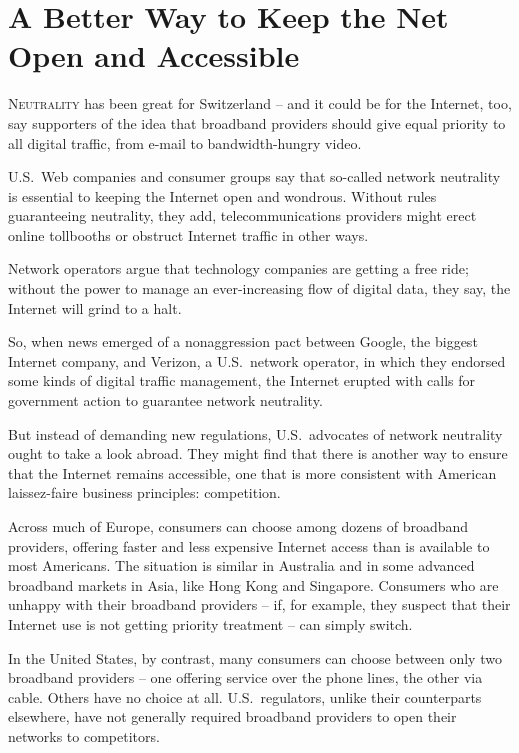 ﻿\documentclass[12pt]{article}
\begin{document}
\section{A Better Way to Keep the Net Open and Accessible}

\lettrine{N}{eutrality} has been great for Switzerland -- and it could be
for the Internet, too, say supporters of the idea that broadband providers should give equal
priority to all digital traffic, from e-mail to bandwidth-hungry video.

U.S.~Web companies and consumer groups say that so-called network neutrality is essential to keeping
the Internet open and wondrous. Without rules guaranteeing neutrality, they add, telecommunications
providers might erect online tollbooths or obstruct Internet traffic in other ways.

Network operators argue that technology companies are getting a free ride; without the power to
manage an ever-increasing flow of digital data, they say, the Internet will grind to a halt.

So, when news emerged of a nonaggression pact between Google, the biggest Internet company, and
Verizon, a U.S.~network operator, in which they endorsed some kinds of digital traffic management,
the Internet erupted with calls for government action to guarantee network neutrality.

But instead of demanding new regulations, U.S.~advocates of network neutrality ought to take a look
abroad. They might find that there is another way to ensure that the Internet remains accessible,
one that is more consistent with American laissez-faire business principles: competition.

Across much of Europe, consumers can choose among dozens of broadband providers, offering faster and
less expensive Internet access than is available to most Americans. The situation is similar in
Australia and in some advanced broadband markets in Asia, like Hong Kong and Singapore. Consumers
who are unhappy with their broadband providers -- if, for example, they suspect that their Internet
use is not getting priority treatment -- can simply switch.

In the United States, by contrast, many consumers can choose between only two broadband providers --
one offering service over the phone lines, the other via cable. Others have no choice at all.
U.S.~regulators, unlike their counterparts elsewhere, have not generally required broadband
providers to open their networks to competitors.
\end{document}
